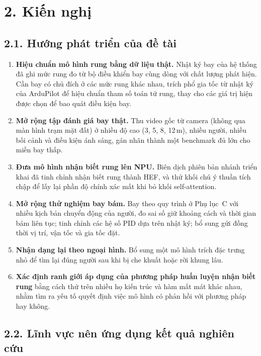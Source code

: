\section*{2. Kiến nghị}

\subsection*{2.1. Hướng phát triển của đề tài}

\begin{enumerate}
\item \textbf{Hiệu chuẩn mô hình rung bằng dữ liệu thật.} Nhật ký bay của hệ thống đã ghi mức rung đo từ bộ điều khiển bay cùng dòng với chất lượng phát hiện. Cần bay có chủ đích ở các mức rung khác nhau, trích phổ gia tốc từ nhật ký của ArduPilot để hiệu chuẩn tham số toán tử rung, thay cho các giá trị hiện được chọn để bao quát điều kiện bay.
\item \textbf{Mở rộng tập đánh giá bay thật.} Thu video gốc từ camera (không qua màn hình trạm mặt đất) ở nhiều độ cao (3, 5, 8, 12\,m), nhiều người, nhiều bối cảnh và điều kiện ánh sáng, gán nhãn thành một benchmark đủ lớn cho miền bay thấp.
\item \textbf{Đưa mô hình nhận biết rung lên NPU.} Biên dịch phiên bản nhánh triển khai đã tinh chỉnh nhận biết rung thành HEF, và thử khối chú ý thuần tích chập để lấy lại phần độ chính xác mất khi bỏ khối self-attention.
\item \textbf{Mở rộng thử nghiệm bay bám.} Bay theo quy trình ở Phụ lục~C với nhiều kịch bản chuyển động của người, đo sai số giữ khoảng cách và thời gian bám liên tục; tinh chỉnh các hệ số PID dựa trên nhật ký; bổ sung gửi đồng thời vị trí, vận tốc và gia tốc đặt.
\item \textbf{Nhận dạng lại theo ngoại hình.} Bổ sung một mô hình trích đặc trưng nhỏ để tìm lại đúng người sau khi bị che khuất hoặc rời khung lâu.
\item \textbf{Xác định ranh giới áp dụng của phương pháp huấn luyện nhận biết rung} bằng cách thử trên nhiều họ kiến trúc và hàm mất mát khác nhau, nhằm tìm ra yếu tố quyết định việc mô hình có phản hồi với phương pháp hay không.
\end{enumerate}

\subsection*{2.2. Lĩnh vực nên ứng dụng kết quả nghiên cứu}


